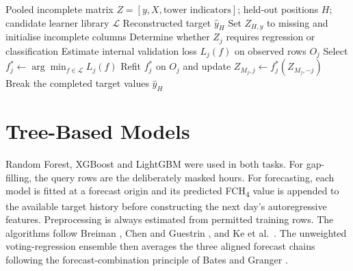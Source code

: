 \begin{algorithm}[H]
\caption{HyperImpute reconstruction with variable-specific AutoML models}
\label{alg:app-hyperimpute}
\small
\begin{algorithmic}[1]
\Require Pooled incomplete matrix $Z=[y,X,\text{tower indicators}]$;
held-out positions $H$; candidate learner library $\mathcal L$
\Ensure Reconstructed target $\hat y_H$
\State Set $Z_{H,y}$ to missing and initialise incomplete columns
        \State Determine whether $Z_j$ requires regression or classification
            \State Estimate internal validation loss $L_j(f)$ on observed rows $O_j$
        \EndFor
        \State Select $f_j^*\gets\arg\min_{f\in\mathcal L}L_j(f)$
        \State Refit $f_j^*$ on $O_j$ and update
        $Z_{M_j,j}\gets f_j^*(Z_{M_j,-j})$
    \EndFor
        \State Break
    \EndIf
\EndFor
\State \Return the completed target values $\hat y_H$
\end{algorithmic}
\end{algorithm}

\section{Tree-Based Models}

Random Forest, XGBoost and LightGBM were used in both tasks. For gap-filling,
the query rows are the deliberately masked hours. For forecasting, each model
is fitted at a forecast origin and its predicted FCH\textsubscript{4} value is
appended to the available target history before constructing the next day's
autoregressive features. Preprocessing is always estimated from permitted
training rows. The algorithms follow Breiman \cite{breiman2001randomforests},
Chen and Guestrin \cite{chen2016xgboost}, and Ke et al.\ \cite{ke2017lightgbm}.
The unweighted voting-regression ensemble then averages the three aligned
forecast chains following the forecast-combination principle of Bates and
Granger \cite{bates1969combination}.


